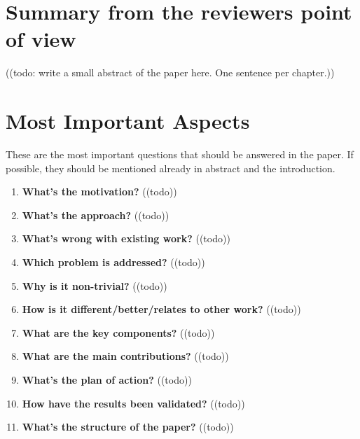 \section*{Summary from the reviewers point of view}\label{sec:summary}
\noindent
\textcolor{HighlightColor}{((todo: write a small abstract of the paper here. One sentence per chapter.))}

\section{Most Important Aspects}\label{sec:mia}
These are the most important questions that should be answered in the paper. If possible,
they should be mentioned already in abstract and the introduction.
\begin{enumerate}[resume]
    \item \textbf{What’s the motivation?} 	\textcolor{HighlightColor}{((todo))}
    \item \textbf{What’s the approach?} 	\textcolor{HighlightColor}{((todo))}
    \item \textbf{What’s wrong with existing work?} 	\textcolor{HighlightColor}{((todo))}
    \item \textbf{Which problem is addressed?} 	\textcolor{HighlightColor}{((todo))}
    \item \textbf{Why is it non-trivial?
} 	\textcolor{HighlightColor}{((todo))}
    \item \textbf{How is it different/better/relates to other work?
} 	\textcolor{HighlightColor}{((todo))}
    \item \textbf{What are the key components?} 	\textcolor{HighlightColor}{((todo))}
    \item \textbf{What are the main contributions?} 	\textcolor{HighlightColor}{((todo))}
    \item \textbf{What’s the plan of action?} 	\textcolor{HighlightColor}{((todo))}
    \item \textbf{How have the results been validated?
} 	\textcolor{HighlightColor}{((todo))}
    \item \textbf{What’s the structure of the paper?} 	\textcolor{HighlightColor}{((todo))}
\end{enumerate}

